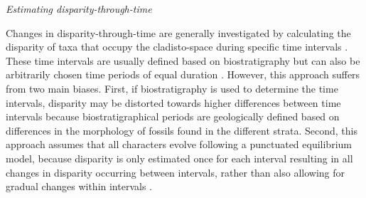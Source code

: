 \documentclass[12pt,letterpaper]{article}
\renewcommand{\subsection}[1]{%
\bigskip
\begin{center}
\begin{large}
\normalfont\itshape #1
\end{large}
\end{center}}
\begin{document}
\subsection{Estimating disparity-through-time} 
Changes in disparity-through-time are generally investigated by calculating the disparity of taxa that occupy the cladisto-space during specific time intervals \citep[e.g][]{cisneros2010,prentice2011,Hughes20082013,hopkinsdecoupling2013,bentonmodels2014,bensonfaunal2014}.
These time intervals are usually defined based on biostratigraphy \citep[e.g.][]{cisneros2010,prentice2011,Hughes20082013,bentonmodels2014} but can also be arbitrarily chosen time periods of equal duration \citep{Butler2012,hopkinsdecoupling2013,bensonfaunal2014}.
However, this approach suffers from two main biases. 
First, if biostratigraphy is used to determine the time intervals, disparity may be distorted towards higher differences between time intervals because biostratigraphical periods are geologically defined based on differences in the morphology of fossils found in the different strata.
Second, this approach assumes that all characters evolve following a punctuated equilibrium model, because disparity is only estimated once for each interval resulting in all changes in disparity occurring between intervals, rather than also allowing for gradual changes within intervals \citep{Hunt21042015}.
\end{document}
